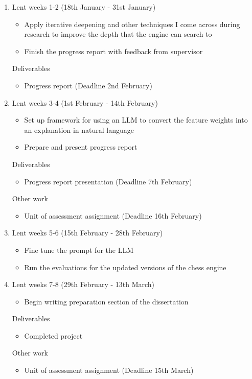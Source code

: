\documentclass[12pt,a4paper]{article}
\begin{document}
\begin{enumerate}
    \item Lent weeks 1-2 (18th January - 31st January)
    \begin{itemize}
        \item Apply iterative deepening and other techniques I come across during research to improve the depth that the engine can search to
        \item Finish the progress report with feedback from supervisor
    \end{itemize}
    Deliverables
    \begin{itemize}
        \item Progress report (Deadline 2nd February)
    \end{itemize}

    \item Lent weeks 3-4 (1st February - 14th February)
    \begin{itemize}
        \item Set up framework for using an LLM to convert the feature weights into an explanation in natural language
        \item Prepare and present progress report
    \end{itemize}
    Deliverables
    \begin{itemize}
        \item Progress report presentation (Deadline 7th February)
    \end{itemize}
    Other work
    \begin{itemize}
        \item Unit of assessment assignment (Deadline 16th February)
    \end{itemize}

    \item Lent weeks 5-6 (15th February - 28th February)
    \begin{itemize}
        \item Fine tune the prompt for the LLM
        \item Run the evaluations for the updated versions of the chess engine
    \end{itemize}

    \item Lent weeks 7-8 (29th February - 13th March)
    \begin{itemize}
        \item Begin writing preparation section of the dissertation
    \end{itemize}
    Deliverables
    \begin{itemize}
        \item Completed project
    \end{itemize}
    Other work
    \begin{itemize}
        \item Unit of assessment assignment (Deadline 15th March)
    \end{itemize}


\end{enumerate}
\end{document}
